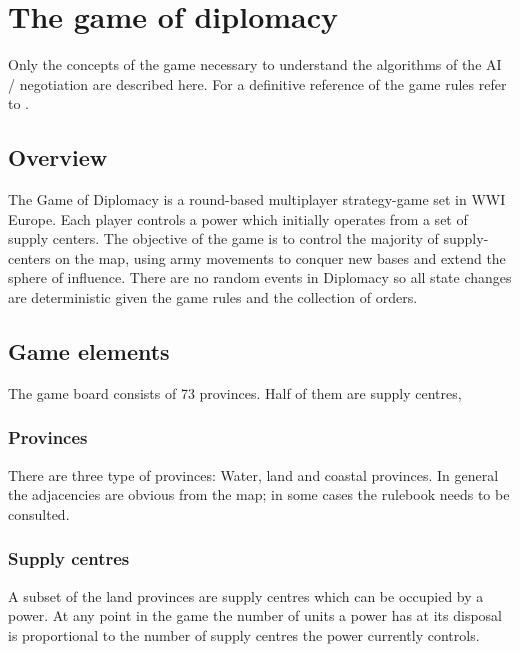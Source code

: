 \documentclass[pdftex,12pt,a4paper]{report}
\begin{document}

\section{The game of diplomacy}

Only the concepts of the game necessary to understand the 
algorithms of the AI / negotiation are described here. For a
definitive reference of the game rules refer to \cite{DiploRules00}.

\subsection{Overview}

The Game of Diplomacy is a round-based multiplayer strategy-game set
in WWI Europe. Each player controls a power which initially
operates from a set of supply centers. The objective of the game is
to control the majority of supply-centers on the map, using army
movements to conquer new bases and extend the sphere of influence.
There are no random events in Diplomacy so all state changes are
deterministic given the game rules and the collection of orders.  \\ 

\subsection{Game elements}

The game board consists of 73 provinces. Half of them are supply centres, 

\subsubsection{Provinces}

There are three type of provinces: Water, land and coastal 
provinces. In general the adjacencies are obvious from the map; 
in some cases the rulebook needs to be consulted.

\subsubsection{Supply centres}

A subset of the land provinces are supply centres which can be 
occupied by a power. At any point in the game the number of units
a power has at its disposal is proportional to the number of 
supply centres the power currently controls.
\end{document}
